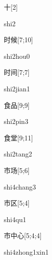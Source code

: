 \begin{verbete}[shi2]{十}[2]
\begin{pronuncia}{shi2}
\end{pronuncia}
\end{verbete}

\begin{verbete}{时候}[7;10]
\begin{pronuncia}{shi2hou0}
\end{pronuncia}
\end{verbete}

\begin{verbete}{时间}[7;7]
\begin{pronuncia}{shi2jian1}
\end{pronuncia}
\end{verbete}

\begin{verbete}{食品}[9;9]
\begin{pronuncia}{shi2pin3}
\end{pronuncia}
\end{verbete}

\begin{verbete}{食堂}[9;11]
\begin{pronuncia}{shi2tang2}
\end{pronuncia}
\end{verbete}

\begin{verbete}{市场}[5;6]
\begin{pronuncia}{shi4chang3}
\end{pronuncia}
\end{verbete}

\begin{verbete}[shi4qu1]{市区}[5;4]
\begin{pronuncia}{shi4qu1}
\end{pronuncia}
\end{verbete}

\begin{verbete}{市中心}[5;4;4]
\begin{pronuncia}{shi4zhong1xin1}
\end{pronuncia}
\end{verbete}

